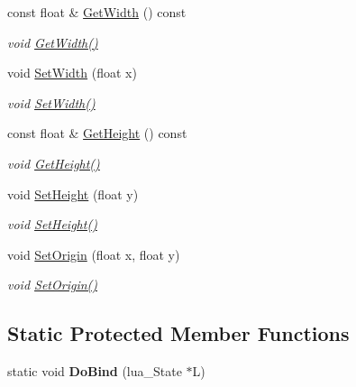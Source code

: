 \begin{DoxyCompactItemize}
const float \& \hyperlink{classrvl_1_1_sprite_component_a6ec0d0b0cba06be74626bc633fa3e516}{Get\+Width} () const
\begin{DoxyCompactList}\small\item\em void \hyperlink{classrvl_1_1_sprite_component_a6ec0d0b0cba06be74626bc633fa3e516}{Get\+Width()} \end{DoxyCompactList}\item 
void \hyperlink{classrvl_1_1_sprite_component_a577953a944ed4540f5fb120d0829dc41}{Set\+Width} (float x)
\begin{DoxyCompactList}\small\item\em void \hyperlink{classrvl_1_1_sprite_component_a577953a944ed4540f5fb120d0829dc41}{Set\+Width()} \end{DoxyCompactList}\item 
const float \& \hyperlink{classrvl_1_1_sprite_component_a411a43e5378af147ee73b4d5037d5d36}{Get\+Height} () const
\begin{DoxyCompactList}\small\item\em void \hyperlink{classrvl_1_1_sprite_component_a411a43e5378af147ee73b4d5037d5d36}{Get\+Height()} \end{DoxyCompactList}\item 
void \hyperlink{classrvl_1_1_sprite_component_a01adb38d3fcc3df48008794b3ae17865}{Set\+Height} (float y)
\begin{DoxyCompactList}\small\item\em void \hyperlink{classrvl_1_1_sprite_component_a01adb38d3fcc3df48008794b3ae17865}{Set\+Height()} \end{DoxyCompactList}\item 
void \hyperlink{classrvl_1_1_sprite_component_a980e38f678f105d9fa184389c1d8266d}{Set\+Origin} (float x, float y)
\begin{DoxyCompactList}\small\item\em void \hyperlink{classrvl_1_1_sprite_component_a980e38f678f105d9fa184389c1d8266d}{Set\+Origin()} \end{DoxyCompactList}\end{DoxyCompactItemize}
\subsection*{Static Protected Member Functions}
\begin{DoxyCompactItemize}
\item 
\mbox{\label{classrvl_1_1_sprite_component_ac384405ccb5bcbce234fc25840e1220d}} 
static void {\bfseries Do\+Bind} (lua\+\_\+\+State $\ast$L)
\end{DoxyCompactItemize}
